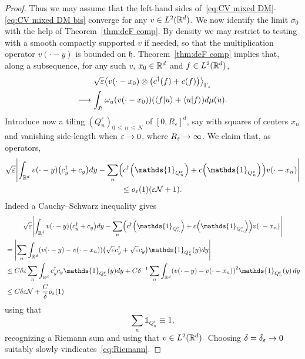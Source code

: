 \documentclass[AHL,Unicode,longabstracts,published]{cedram}
\newcommand{\R}{\mathbb{R}}
\newcommand{\cN}{\mathcal{N}}
\newcommand{\gH}{\mathfrak{H}}
\newcommand{\gh}{\mathfrak{h}}
\newcommand{\1}{\mathds{1}}
\newcommand{\eps}{\varepsilon}
\newcommand{\cda}{c^{\dagger}}
\let\oldin\in
\renewcommand{\in}{\mathchoice{\oldin}{\oldin}{\,\oldin\,}{\,\oldin\,}}
\renewcommand*{\to}{\mathchoice{\longrightarrow}{\rightarrow}{\rightarrow}{\rightarrow}}
\let\originalleft\left
\let\originalright\right
\renewcommand{\left}{\mathopen{}\mathclose\bgroup\originalleft}
\renewcommand{\right}{\aftergroup\egroup\originalright}
\begin{document}
\begin{proof}
Thus we may assume that the left-hand sides of~\eqref{eq:CV mixed DM}-\eqref{eq:CV mixed DM bis} converge for any $v\in L^2 (\R^d)$. We now identify the limit $\sigma_0$ with the help of Theorem~\ref{thm:deF comp}. By density we may restrict to testing with a smooth compactly supported $v$ if needed, so that the multiplication operator $v(\cdot-y)$ is bounded on $\gh$. Theorem~\ref{thm:deF comp} implies that, along a subsequence, for any such $v$, $x_0 \in \R^d$ and $f\in L^2 (\R^d)$,
\begin{multline}\label{eq:CV mixed 1}
\sqrt{\eps} \left\langle v (\cdot - x_0) \otimes \left(\cda (f) + c (f) \right)\right\rangle_{\Gamma_\eps}\\
 \to \int_{\gH} \omega_u \left(v (\cdot - x_0)\right) \left(\langle f | u \rangle + \langle u| f \rangle \right) d\mu (u).
\end{multline}
Introduce now a tiling $(Q^\eps_n)_{0\,\leq\,n\,\leq\,N}$ of $[0,R_\eps]^d$, say with squares of centers $x_n$ and vanishing side-length when $\eps \to 0$, where $R_\eps \to \infty$. We claim that, as operators,
\begin{multline}\label{eq:Riemann}
\sqrt{\eps}\left| \int_{\R^d} v(\cdot - y) \left(\cda_y + c_y\right) dy - \sum_n \left(\cda \left(\1_{Q^\eps_n}\right) + c \left(\1_{Q^\eps_n}\right)\right) v(\cdot-x_n)
\right|\\
\leq o_\eps (1) \left(\eps \cN +1\right).
\end{multline}
Indeed a Cauchy--Schwarz inequality gives
\begin{multline*}
\sqrt{\eps}\left| \int_{\R^d} v(\cdot - y) \left(\cda_y + c_y \right) dy - \sum_n \left(\cda \left(\1_{Q^\eps_n}\right) + c \left(\1_{Q^\eps_n}\right)\right) v(\cdot-x_n)
\right|
\\
\begin{aligned}
&= \left| \sum_n \int_{\R^d} \left(v(\cdot - y) - v (\cdot-x_n)\right) \left(\sqrt{\eps}\cda_y + \sqrt{\eps}c_y\right) \1_{Q^\eps_n}(y)dy \right|
\\ 
&\leq C \delta \eps \sum_n \int_{\R^d} \cda_y c_y \1_{Q^\eps_n} (y) dy + C\delta^{-1} \sum_n \int_{\R^d} \left(v(\cdot - y) - v (\cdot-x_n)\right)^2 \1_{Q^\eps_n} (y)\, dy\\
&\leq C \delta \eps \cN + \frac{C}{\delta} o_\eps (1)
\end{aligned}
\end{multline*}
using that
\begin{equation*}
\sum_n \1_{Q^\eps_n} \equiv 1,
\end{equation*}
recognizing a Riemann sum and using that $v \in L^2 (\R^d).$ Choosing $\delta = \delta_\eps \to 0$ suitably slowly vindicates~\eqref{eq:Riemann}.


\end{proof}
\end{document}
